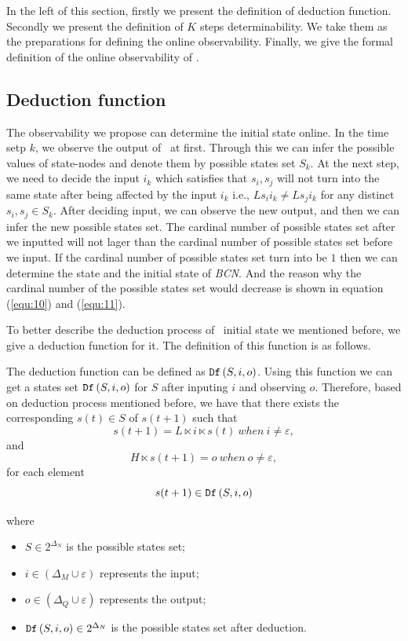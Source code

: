 In the left of this section, firstly we present the definition of deduction function. Secondly we present the definition of $K$ steps determinability. We take them as the preparations for defining the online observability. Finally, we give the formal definition of the online observability of \BCNs. 
\subsection{Deduction function}
The observability we propose can determine the initial state online.
 In the time setp $k$, we observe the output of \BCNs\ at first. Through this we can infer the possible values of state-nodes and denote them by possible states set $S_k$. %
 At the next step, we need to decide the input $i_k$ which satisfies that %
$s_i, s_j$ 
 will not turn into the same state after being affected by the input $i_k$ i.e., $Ls_i i_k\neq Ls_j i_k$ for any distinct $s_i, s_j\in S_k$. After deciding input, we can observe the new output, and then we can infer the new possible states set. The cardinal number of possible states set after we inputted will not lager than the cardinal number of possible states set before we input. If the cardinal number of possible states set turn into be $1$ then we can determine the state and the initial state of {\em BCN}. And the reason why the cardinal number of the possible states set would decrease is shown in equation (\ref{equ:10}) and (\ref{equ:11}). 
 
To better describe the deduction process of \BCN\ initial state we mentioned before, we give a deduction function for it. The definition of this function is as follows.
\begin{definition} The deduction function can be defined as ${\tt Df}\left(S, i, o\right)$. Using this function we can get a states set ${\tt Df}\left(S, i, o\right)$ for $S$ after inputing $i$ and observing $o$. Therefore, based on deduction process mentioned before, we have that there exists the corresponding $s(t)\in S$ of $s(t+1)$ such that \[s(t+1)=L\ltimes i\ltimes s(t)\ when\ i\neq \varepsilon, \] and \[H\ltimes s(t+1)=o\ when\ o\neq \varepsilon, \]
for each element \[s(t+1)\in {\tt Df}\left(S, i, o\right)\]
\end{definition}
where   
\begin{itemize}
  \item $S\in 2^{\Delta_N}$ is the possible states set;
  \item $i\in (\Delta_M\cup\varepsilon)$ represents the input;
  \item $o\in(\Delta_Q\cup\varepsilon)$ represents the output; 
  \item ${\tt Df}\left(S, i, o\right)\in 2^{\Delta_N}$ is the possible states set after deduction.
\end{itemize} 
 
